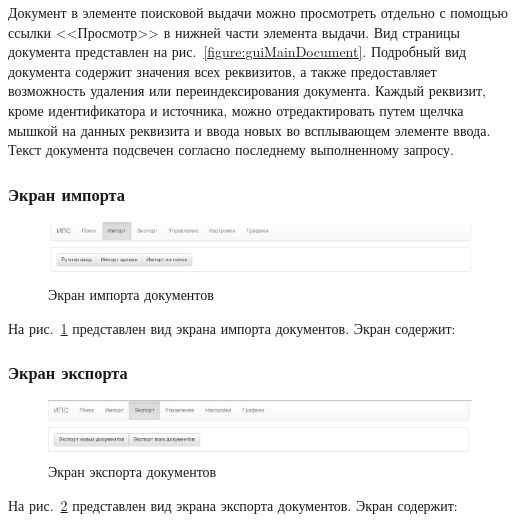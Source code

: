 Документ в элементе поисковой выдачи можно просмотреть отдельно с помощью ссылки <<Просмотр>> в нижней части элемента выдачи. Вид страницы документа представлен на рис.~\ref{figure:guiMainDocument}. Подробный вид документа содержит значения всех реквизитов, а также предоставляет возможность удаления или переиндексирования документа. Каждый реквизит, кроме идентификатора и источника, можно отредактировать путем щелчка мышкой на данных реквизита и ввода новых во всплывающем элементе ввода. Текст документа подсвечен согласно последнему выполненному запросу.

\clearpage
\subsubsection{Экран импорта}

\begin{figure}[h!]
\centering
\includegraphics[width=0.9\linewidth]{technology/gui_import}
\caption{Экран импорта документов}
\label{figure:guiImport}
\end{figure}

На рис.~\ref{figure:guiImport} представлен вид экрана импорта документов. Экран содержит:
\begin{itemize}

\end{itemize}

\clearpage
\subsubsection{Экран экспорта}

\begin{figure}[h!]
\centering
\includegraphics[width=0.9\linewidth]{technology/gui_export}
\caption{Экран экспорта документов}
\label{figure:guiExport}
\end{figure}

На рис.~\ref{figure:guiExport} представлен вид экрана экспорта документов. Экран содержит:
\begin{itemize}

\end{itemize}

